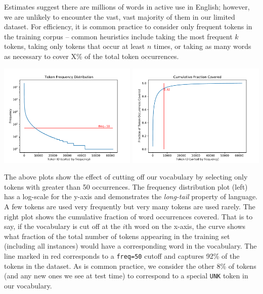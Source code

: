 \documentclass[a4paper,10pt]{article}
\begin{document}
 Estimates suggest there are millions of words in active use in English; however, we are unlikely to encounter the vast, vast majority of them in our limited dataset. For efficiency, it is common practice to consider only frequent tokens in the training corpus -- common heuristics include taking the most frequent $k$ tokens, taking only tokens that occur at least $n$ times, or taking as many words as necessary to cover X\% of the total token occurrences. 
%
%
\begin{center}
\includegraphics[width=0.495\textwidth]{figures/freq.pdf}\hfill
\includegraphics[width=0.495\textwidth]{figures/cover.pdf}
\end{center}
%
%
The above plots show the effect of cutting off our vocabulary by selecting only tokens with greater than 50 occurrences. The frequency distribution plot (left) has a log-scale for the y-axis and demonstrates the \emph{long-tail} property of language. A few tokens are used very frequently but very many tokens are used rarely. The right plot shows the cumulative fraction of word occurrences covered. That is to say,  if the vocabulary is cut off at the $i$th word on the x-axis, the curve shows what fraction of the total number of tokens appearing in the training set (including all instances) would have a corresponding word in the vocabulary. The line marked in red corresponds to a \texttt{freq=50} cutoff and captures 92\% of the tokens in the dataset. As is common practice, we consider the other 8\% of tokens (and any new ones we see at test time) to correspond to a special \texttt{UNK} token in our vocabulary. 
\end{document}
